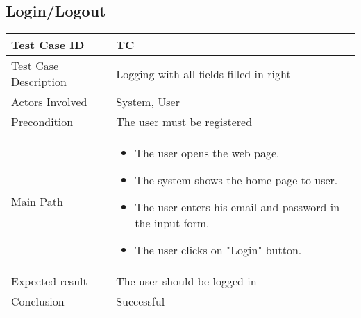 \newpage
\subsection{Login/Logout}
\par
\begin{center} \begin{tabular}{|l|l|}
  \hline
  Test Case ID & TC \z\\
  \hline
  Test Case Description & Logging with all fields filled in right\\
  \hline
  Actors Involved & System, User\\
   \hline
  Precondition & The user must be registered\\
  \hline
  Main Path &   \begin{minipage}{5in}
    \vskip 4pt
            \begin{itemize}
              \item The user opens the web page.
              \item The system shows the home page to user.
              \item The user enters his email and password in the input form.
              \item The user clicks on "Login" button.
            \end{itemize}
    \vskip 4pt
  \end{minipage}  \\
  \hline
  Expected result & The user should be logged in\\
  \hline
  Conclusion & Successful\\
  \hline
\end{tabular} \end{center}

